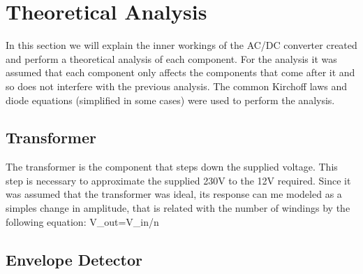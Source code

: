 
\section{Theoretical Analysis}
\label{sec:analysis}



In this section we will explain the inner workings of the AC/DC converter created and perform a theoretical analysis of each component. For the analysis it was assumed that each component only affects the components that come after it and so does not interfere with the previous analysis.
The common Kirchoff laws and diode equations (simplified in some cases) were used to perform the analysis.


\subsection{Transformer}
\label{subsec:transf}

The transformer is the component that steps down the supplied voltage. This step is necessary to approximate the supplied 230V to the 12V required. Since it was assumed that the transformer was ideal, its response can me modeled as a simples change in amplitude, that is related with the number of windings by the following equation:
V_out=V_in/n


\subsection{Envelope Detector}
\label{subsec:envdet}

